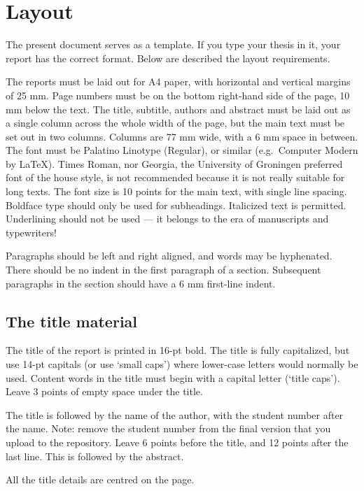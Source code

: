 
\section{Layout}\label{sec:layout}
The present document serves as a template.
If you type your thesis in it, your report has the correct format.
Below are described the layout requirements.

The reports must be laid out for A4 paper, with horizontal and vertical margins of 25 mm.
Page numbers must be on the bottom right-hand side of the page, 10 mm below the text.
The title, subtitle, authors and abstract must be laid out as a single column across the whole width of the page, but the main text must be set out in two columns.
Columns are 77 mm wide, with a 6 mm space in between.
The font must be Palatino Linotype (Regular), or similar (e.g.\ Computer Modern by \LaTeX).
Times Roman, nor Georgia, the University of Groningen preferred font of the house style, is not recommended because it is not really suitable for long texts.
The font size is 10 points for the main text, with single line spacing.
Boldface type should only be used for subheadings.
Italicized text is permitted.
Underlining should not be used –-- it belongs to the era of manuscripts and typewriters!

Paragraphs should be left and right aligned, and words may be hyphenated.
There should be no indent in the first paragraph of a section.
Subsequent paragraphs in the section should have a 6 mm first-line indent.

\subsection{The title material}\label{sec:_title_material}
The title of the report is printed in 16-pt bold.
The title is fully capitalized, but use 14-pt capitals (or use `small caps') where lower-case letters would normally be used.
Content words in the title must begin with a capital letter (`title caps').
Leave 3 points of empty space under the title.

The title is followed by the name of the author, with the student number after the name.
Note: remove the student number from the final version that you upload to the repository.
Leave 6 points before the title, and 12 points after the last line.
This is followed by the abstract.

All the title details are centred on the page.

